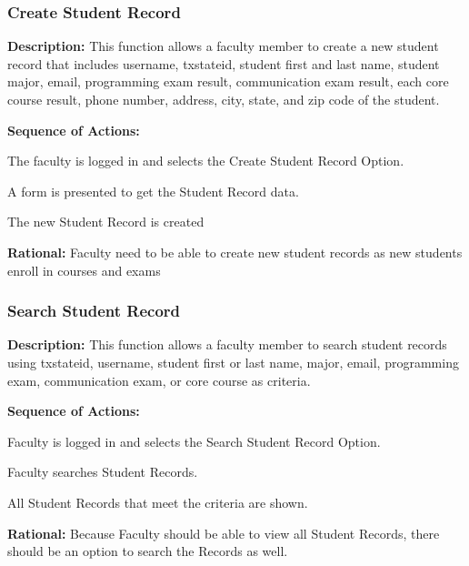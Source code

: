    \subsubsection{\large Create Student Record} 
   \begin{boxed} %
      \textbf{Description:}
      {\small This function allows a faculty member to create a new student
         record that includes username, txstateid, student first and last name,
         student major, email, programming exam result, communication exam
         result, each core course result, phone number, address, city, state,
         and zip code of the student.}
         
         \textbf{Sequence of Actions:}
         \begin{enumerate}
               {\small
            \item The faculty is logged in and selects the Create Student Record
               Option.
            \item A form is presented to get the Student Record data.
            \item The new Student Record is created}
      \end{enumerate}

         \textbf{Rational:}
         {\small Faculty need to be able to create new student records as new students
         enroll in courses and exams}
   \end{boxed} %

   \subsubsection{\large Search Student Record} 
   \begin{boxed} %
      \textbf{Description:}
      {\small This function allows a faculty member to search student records
         using txstateid, username, student first or last name, major,
         email, programming exam, communication exam, or core course as
         criteria.}
         
         \textbf{Sequence of Actions:}
         \begin{enumerate}
               {\small
            \item Faculty is logged in and selects the Search Student Record Option.
            \item Faculty searches Student Records.
            \item All Student Records that meet the criteria are shown.}
      \end{enumerate}

         \textbf{Rational:}
         {\small Because Faculty should be able to view all Student Records, there
         should be an option to search the Records as well.}
   \end{boxed} %

